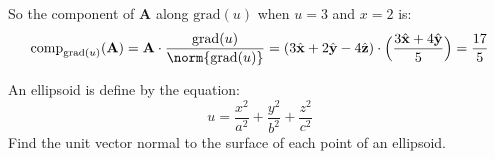 \begin{solution}
                So the component of $\mathbf{A}$ along
                $\mathrm{grad}(u)$ when $u=3$ and $x=2$ is:
                \begin{equation}
                    \mathrm{comp}_{\mathrm{grad}(u)}(\mathbf{A})
                    =\mathbf{A}\cdot\frac{\mathrm{grad}(u)}
                        {\norm{\mathrm{grad}(u)}}
                    =(3\hat{\mathbf{x}}
                     +2\hat{\mathbf{y}}
                     -4\hat{\mathbf{z}})\cdot\Big(
                        \frac{3\hat{\mathbf{x}}
                             +4\hat{\mathbf{y}}}{5}
                        \Big)
                    =\frac{17}{5}
                \end{equation}
            \end{solution}
            \begin{problem}
                An ellipsoid is define by the equation:
                \begin{equation}
                    u=\frac{x^{2}}{a^{2}}
                     +\frac{y^{2}}{b^{2}}
                     +\frac{z^{2}}{c^{2}}
                \end{equation}
                Find the unit vector normal to the
                surface of each point of an ellipsoid.
            \end{problem}
